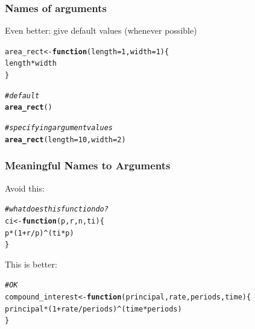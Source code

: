 \documentclass[12pt]{beamer}\usepackage[]{graphicx}\usepackage[]{color}
\makeatletter
\newcommand{\hlnum}[1]{\textcolor[rgb]{0.686,0.059,0.569}{#1}}%
\newcommand{\hlcom}[1]{\textcolor[rgb]{0.678,0.584,0.686}{\textit{#1}}}%
\newcommand{\hlopt}[1]{\textcolor[rgb]{0,0,0}{#1}}%
\newcommand{\hlstd}[1]{\textcolor[rgb]{0.345,0.345,0.345}{#1}}%
\newcommand{\hlkwa}[1]{\textcolor[rgb]{0.161,0.373,0.58}{\textbf{#1}}}%
\newcommand{\hlkwb}[1]{\textcolor[rgb]{0.69,0.353,0.396}{#1}}%
\newcommand{\hlkwc}[1]{\textcolor[rgb]{0.333,0.667,0.333}{#1}}%
\newcommand{\hlkwd}[1]{\textcolor[rgb]{0.737,0.353,0.396}{\textbf{#1}}}%
\newenvironment{kframe}{%
 \def\at@end@of@kframe{}%
 \ifinner\ifhmode%
  \def\at@end@of@kframe{\end{minipage}}%
  \begin{minipage}{\columnwidth}%
 \fi\fi%
 \def\FrameCommand##1{\hskip\@totalleftmargin \hskip-\fboxsep
 \colorbox{shadecolor}{##1}\hskip-\fboxsep
     \hskip-\linewidth \hskip-\@totalleftmargin \hskip\columnwidth}%
 \MakeFramed {\advance\hsize-\width
   \@totalleftmargin\z@ \linewidth\hsize
   \@setminipage}}%
 {\par\unskip\endMakeFramed%
 \at@end@of@kframe}
\newenvironment{knitrout}{}{} %
\makeatother
\begin{document}

\begin{frame}[fragile]
\frametitle{Names of arguments}

Even better: give default values (whenever possible)
\begin{knitrout}\footnotesize
{}\color{fgcolor}\begin{kframe}
\begin{alltt}
\hlstd{area_rect} \hlkwb{<-} \hlkwa{function}\hlstd{(}\hlkwc{length} \hlstd{=} \hlnum{1}\hlstd{,} \hlkwc{width} \hlstd{=} \hlnum{1}\hlstd{) \{}
  \hlstd{length} \hlopt{*} \hlstd{width}
\hlstd{\}}

\hlcom{# default}
\hlkwd{area_rect}\hlstd{()}

\hlcom{# specifying argument values}
\hlkwd{area_rect}\hlstd{(}\hlkwc{length} \hlstd{=} \hlnum{10}\hlstd{,} \hlkwc{width} \hlstd{=} \hlnum{2}\hlstd{)}
\end{alltt}
\end{kframe}
\end{knitrout}

\end{frame}


\begin{frame}[fragile]
\frametitle{Meaningful Names to Arguments}

Avoid this:
\begin{knitrout}\footnotesize
{}\color{fgcolor}\begin{kframe}
\begin{alltt}
\hlcom{# what does this function do?}
\hlstd{ci} \hlkwb{<-} \hlkwa{function}\hlstd{(}\hlkwc{p}\hlstd{,} \hlkwc{r}\hlstd{,} \hlkwc{n}\hlstd{,} \hlkwc{ti}\hlstd{) \{}
  \hlstd{p} \hlopt{*} \hlstd{(}\hlnum{1} \hlopt{+} \hlstd{r}\hlopt{/}\hlstd{p)}\hlopt{^}\hlstd{(ti} \hlopt{*} \hlstd{p)}
\hlstd{\}}
\end{alltt}
\end{kframe}
\end{knitrout}

\pause
This is better:
\begin{knitrout}\footnotesize
{}\color{fgcolor}\begin{kframe}
\begin{alltt}
\hlcom{# OK}
\hlstd{compound_interest} \hlkwb{<-} \hlkwa{function}\hlstd{(}\hlkwc{principal}\hlstd{,} \hlkwc{rate}\hlstd{,} \hlkwc{periods}\hlstd{,} \hlkwc{time}\hlstd{) \{}
  \hlstd{principal} \hlopt{*} \hlstd{(}\hlnum{1} \hlopt{+} \hlstd{rate}\hlopt{/}\hlstd{periods)}\hlopt{^}\hlstd{(time} \hlopt{*} \hlstd{periods)}
\hlstd{\}}
\end{alltt}
\end{kframe}
\end{knitrout}

\end{frame}
\end{document}
